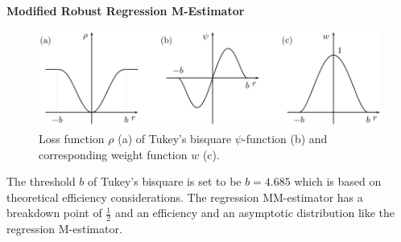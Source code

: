 \textbf{Modified Robust Regression M-Estimator}\\
\begin{figure}[H]
  \centering
  \includegraphics[width=0.9\linewidth]{Pics/10.4.5.png}
  \caption{Loss function $\rho$ (a) of Tukey's bisquare $\psi$-function (b) and corresponding weight function $w$ (c).}
\end{figure}
The threshold $b$ of Tukey’s bisquare is set to be $b = 4.685$ which is based on theoretical efficiency considerations. The regression MM-estimator has a breakdown point of $\frac{1}{2}$ and an efficiency and an asymptotic distribution like the regression M-estimator.
